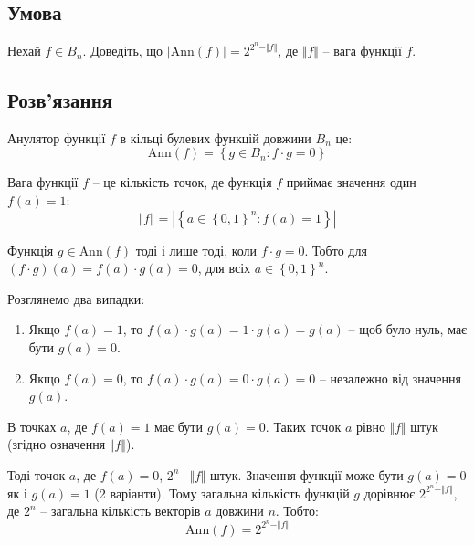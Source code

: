 \chapter{}
\label{chap:1}

\section{Умова}

Нехай $f \in B_{n}$. Доведіть, що $\left|\text{Ann}(f)\right| = 2^{2^{n} - \Vert f\Vert}$, де 
$\Vert f\Vert$ -- вага функції $f$.

\section{Розв'язання}

Анулятор функції $f$ в кільці булевих функцій довжини $B_{n}$ це:
\begin{equation*}
    \text{Ann}(f) = \left\{ g \in B_{n} : f \cdot g = 0\right\}
\end{equation*}

\noindent Вага функції $f$ -- це кількість точок, де функція $f$ приймає значення один $f(a) = 1$:
\begin{equation*}
    \Vert f \Vert = \left|\left\{a \in \left\{0, 1\right\}^{n} : f(a) = 1\right\}\right|
\end{equation*}

Функція $g \in \text{Ann}(f)$ тоді і лише тоді, коли $f \cdot g = 0$. Тобто для 
$\left( f \cdot g\right) (a) = f(a) \cdot g(a) = 0$, для всіх $a \in \left\{0, 1\right\}^{n}$.

Розглянемо два випадки:
\begin{enumerate}
    \item Якщо $f(a) = 1$, то $f(a) \cdot g(a) = 1 \cdot g(a) = g(a)$ -- щоб було нуль, має бути $g(a) = 0$.
    \item Якщо $f(a) = 0$, то $f(a) \cdot g(a) = 0 \cdot g(a) = 0$ -- незалежно від значення $g(a)$.
\end{enumerate}
В точках $a$, де $f(a) = 1$ має бути $g(a) = 0$. Таких точок $a$ рівно $\Vert f\Vert$ штук (згідно означення $\Vert f \Vert$).

Тоді точок $a$, де $f(a) = 0$, $2^{n} - \Vert f\Vert$ штук. Значення функції може бути $g(a) = 0$ як і $g(a) = 1$ 
(2 варіанти). Тому загальна кількість функцій $g$ дорівнює $2^{2^{n} - \Vert f\Vert}$, де $2^{n}$ -- загальна 
кількість векторів $a$ довжини $n$. Тобто:
\begin{equation*}
    \text{Ann}(f) = 2^{2^{n} - \Vert f\Vert}
\end{equation*}